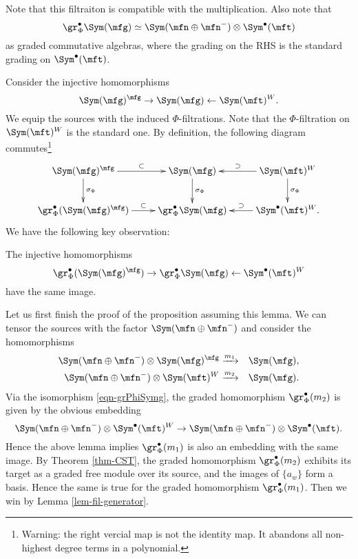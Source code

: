		Note that this filtraiton is compatible with the multiplication. Also note that
		\begin{equation}
			\label{eqn-grPhiSymg}
			\gr_\Phi^\bullet \Sym(\mfg) \simeq  \Sym(\mfn \oplus \mfn^-) \ot  \Sym^\bullet(\mft)
		\end{equation}
		as graded commutative algebras, where the grading on the RHS is the standard grading on $\Sym^\bullet(\mft)$. 

		Consider the injective homomorphisms
		\[
			\Sym(\mfg)^\mfg \to \Sym(\mfg) \gets \Sym(\mft)^W.
		\]
		We equip the sources with the induced $\Phi$-filtrations. Note that the $\Phi$-filtration on $\Sym(\mft)^W$ is the standard one. By definition, the following diagram commutes\footnote{Warning: the right vercial map is not the identity map. It abandons all non-highest degree terms in a polynomial.}
		\[
			\xymatrix{
				\Sym(\mfg)^\mfg \ar[r]^-\subset \ar[d]^-{\sigma_\Phi} 
				& \Sym(\mfg) \ar[d]^-{\sigma_\Phi} 
				& \Sym(\mft)^W \ar[l]_-\supset \ar[d]^-{\sigma_\Phi} \\
				\gr_\Phi^\bullet(\Sym(\mfg)^\mfg) \ar[r]^-\subset
				& \gr_\Phi^\bullet \Sym(\mfg) 
				& \Sym^\bullet(\mft)^W. \ar[l]_-\supset
			}
		\]
		We have the following key observation:
		\begin{lem}
			\label{lem-key}
			The injective homomorphisms
			\[
				\gr_\Phi^\bullet(\Sym(\mfg)^\mfg) \to \gr_\Phi^\bullet \Sym(\mfg)  \gets \Sym^\bullet(\mft)^W
			\]
			have the same image.
		\end{lem}

		Let us first finish the proof of the proposition assuming this lemma. We can tensor the sources with the factor $\Sym(\mfn\oplus \mfn^-)$ and consider the homomorphisms
		\begin{eqnarray*}
			\Sym(\mfn\oplus \mfn^-) \ot \Sym(\mfg)^\mfg  &\xrightarrow{m_1}& \Sym(\mfg), \\
			\Sym(\mfn\oplus \mfn^-) \ot \Sym(\mft)^W  &\xrightarrow{m_2}& \Sym(\mfg).
		\end{eqnarray*}
		Via the isomorphism \eqref{eqn-grPhiSymg}, the graded homomorphism $\gr_\Phi^\bullet(m_2)$ is given by the obvious embedding
		\[
			\Sym(\mfn\oplus \mfn^-) \ot \Sym^\bullet(\mft)^W \to \Sym(\mfn\oplus \mfn^-) \ot \Sym^\bullet(\mft).
		\]
		Hence the above lemma implies $\gr_\Phi^\bullet(m_1)$ is also an embedding with the same image. By Theorem \ref{thm-CST}, the graded homomorphism $\gr_\Phi^\bullet(m_2)$ exhibits its target as a graded free module over its source, and the images of $\{a_w\}$ form a basis. Hence the same is true for the graded homomorphism $\gr_\Phi^\bullet(m_1)$. Then we win by Lemma \ref{lem-fil-generator}.


